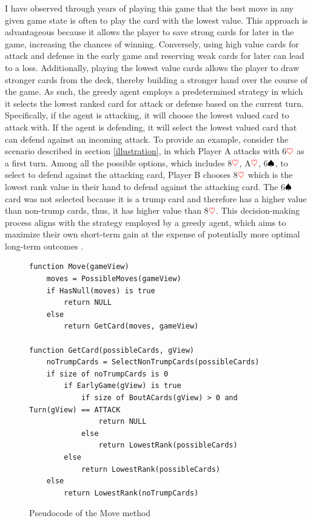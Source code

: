 I have observed through years of playing this game that the best move in any given game state is often to play the card with the lowest value. This approach is advantageous because it allows the player to save strong cards for later in the game, increasing the chances of winning. Conversely, using high value cards for attack and defense in the early game and reserving weak cards for later can lead to a loss. Additionally, playing the lowest value cards allows the player to draw stronger cards from the deck, thereby building a stronger hand over the course of the game. As such, the greedy agent employs a predetermined strategy in which it selects the lowest ranked card for attack or defense based on the current turn. Specifically, if the agent is attacking, it will choose the lowest valued card to attack with. If the agent is defending, it will select the lowest valued card that can defend against an incoming attack. To provide an example, consider the scenario described in section \ref{illustration}, in which Player A attacks with 6$\textcolor{red}{\heartsuit}$ as a first turn. Among all the possible options, which includes 8$\textcolor{red}{\heartsuit}$, A$\textcolor{red}{\heartsuit}$, 6$\textcolor{black}{\spadesuit}$, to select to defend against the attacking card, Player B chooses 8$\textcolor{red}{\heartsuit}$ which is the lowest rank value in their hand to defend against the attacking card. The 6$\textcolor{black}{\spadesuit}$ card was not selected because it is a trump card and therefore has a higher value than non-trump cards, thus, it has higher value than 8$\textcolor{red}{\heartsuit}$. This decision-making process aligns with the strategy employed by a greedy agent, which aims to maximize their own short-term gain at the expense of potentially more optimal long-term outcomes \citep{AI4Ed}.

\begin{figure}[h]
\captionsetup{justification=centering}
\begin{lstlisting}
function Move(gameView)
    moves = PossibleMoves(gameView)
    if HasNull(moves) is true
        return NULL
    else
        return GetCard(moves, gameView)

function GetCard(possibleCards, gView)
    noTrumpCards = SelectNonTrumpCards(possibleCards)
    if size of noTrumpCards is 0
        if EarlyGame(gView) is true
            if size of BoutACards(gView) > 0 and Turn(gView) == ATTACK
                return NULL
            else
                return LowestRank(possibleCards)
        else
            return LowestRank(possibleCards)
    else
        return LowestRank(noTrumpCards)
\end{lstlisting}
\caption{Pseudocode of the Move method}
\label{fig:greedyMove}
\end{figure}

